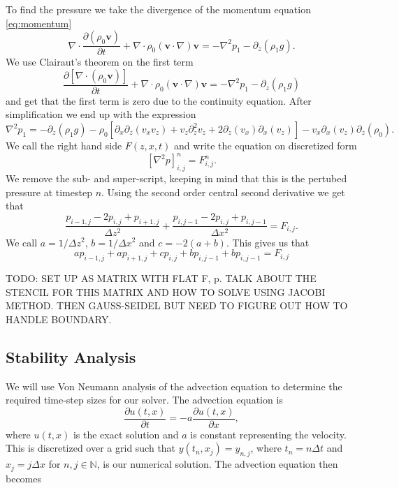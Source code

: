 To find the pressure we take the divergence of the momentum equation \ref{eq:momentum}
\begin{equation*}
    \nabla\cdot\frac{\partial\left(\rho_0\mathbf{v}\right)}{\partial t}+\nabla\cdot\rho_0(\mathbf{v}\cdot\nabla)\mathbf{v}=-\nabla^2 p_1 - \partial_z\left(\rho_1 g\right).
\end{equation*}
We use Clairaut's theorem on the first term 
\begin{equation*}
    \frac{\partial\left[\nabla\cdot\left(\rho_0\mathbf{v}\right)\right]}{\partial t}+\nabla\cdot\rho_0(\mathbf{v}\cdot\nabla)\mathbf{v}=-\nabla^2 p_1 - \partial_z\left(\rho_1 g\right)
\end{equation*}
and get that the first term is zero due to the continuity equation. After simplification we end up with the expression
\begin{equation}\label{eq:elliptic}
    \nabla^2 p_1 = - \partial_z\left(\rho_1 g\right)
    -\rho_0\left[\partial_x\partial_z(v_x v_z)+v_z\partial^2_z v_z+2\partial_z(v_x)\partial_x(v_z)\right]
    -v_x \partial_x(v_z)\partial_z(\rho_0).
\end{equation}
We call the right hand side $F(z,x,t)$ and write the equation on discretized form
\begin{equation}
    \left[\nabla^2 p \right]_{i,j}^n = F_{i,j}^n.
\end{equation}
We remove the sub- and super-script, keeping in mind that this is the pertubed pressure at timestep $n$. Using the second order central second derivative we get that
\begin{equation}
    \frac{p_{i-1,j}-2p_{i,j}+p_{i+1,j}}{\Delta z^2} + \frac{p_{i,j-1}-2p_{i,j}+p_{i,j-1}}{\Delta x^2} = F_{i,j}.
\end{equation}
We call $a=1/\Delta z^2$, $b=1/\Delta x^2$ and $c=-2(a+b)$. This gives us that
\begin{equation}
    ap_{i-1,j}+ap_{i+1,j}+cp_{i,j}+bp_{i,j-1}+bp_{i,j-1}=F_{i,j}
\end{equation}

TODO: SET UP AS MATRIX WITH FLAT F, p. TALK ABOUT THE STENCIL FOR THIS MATRIX AND HOW TO SOLVE USING JACOBI METHOD. THEN GAUSS-SEIDEL BUT NEED TO FIGURE OUT HOW TO HANDLE BOUNDARY.

\subsection{Stability Analysis}
\label{subsec:von_neumann}

We will use Von Neumann analysis of the advection equation to determine the required time-step sizes for our solver. The advection equation is
\begin{equation}
    \frac{\partial u(t,x)}{\partial t} = -a \frac{\partial u(t,x)}{\partial x},
\end{equation}
where $u(t,x)$ is the exact solution and $a$ is constant representing the velocity. This is discretized over a grid such that $y(t_n,x_j)=y_{n,j}$, where $t_n = n\Delta t$ and $x_j = j\Delta x$ for $n,j\in\mathbb{N}$, is our numerical solution. The advection equation then becomes


